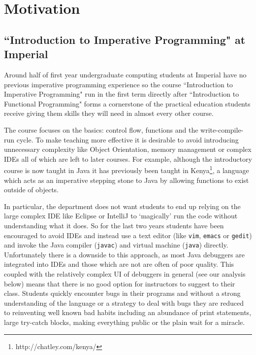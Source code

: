 \documentclass[11pt, a4paper]{article}
\newcommand{\cmd}[1]{{\tt #1}}
\begin{document}
\clearpage
\tableofcontents
\clearpage

\section{Motivation}
\subsection{``Introduction to Imperative Programming" at Imperial}
Around half of first year undergraduate computing students at Imperial have no previous imperative programming experience\cite{projectproposal} so the course ``Introduction to Imperative Programming" run in the first term directly after ``Introduction to Functional Programming" forms a cornerstone of the practical education students receive giving them skills they will need in almost every other course.

The course focuses on the basics: control flow, functions and the write-compile-run cycle.
To make teaching more effective it is desirable to avoid introducing unnecessary complexity like Object Orientation, memory management or complex IDEs all of which are left to later courses.
For example, although the introductory course is now taught in Java it has previously been taught in Kenya\footnote{http://chatley.com/kenya/}, a language which acts as an imperative stepping stone to Java by allowing functions to exist outside of objects.

In particular, the department does not want students to end up relying on the large complex IDE like Eclipse or IntelliJ to `magically' run the code without understanding what it does.
So for the last two years students have been encouraged to avoid IDEs and instead use a text editor (like \cmd{vim}, \cmd{emacs} or \cmd{gedit}) and invoke the Java compiler (\cmd{javac}) and virtual machine (\cmd{java}) directly.
Unfortunately there is a downside to this approach, as most Java debuggers are integrated into IDEs and those which are not are often of poor quality. This coupled with the relatively complex UI of debuggers in general (see our analysis below) means that there is no good option for instructors to suggest to their class.
Students quickly encounter bugs in their programs and without a strong understanding of the language or a strategy to deal with bugs they are reduced to reinventing well known bad habits including an abundance of print statements, large try-catch blocks, making everything public or the plain wait for a miracle.
\end{document}
